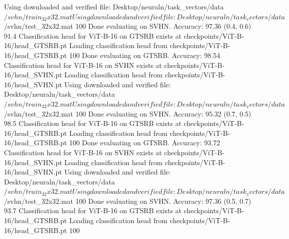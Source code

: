 Using downloaded and verified file: Desktop/neuraln/task_vectors/data$/svhn/train_32x32.mat
Using downloaded and verified file: Desktop/neuraln/task_vectors/data$/svhn/test_32x32.mat
100%
Done evaluating on SVHN. Accuracy: 97.36%
  (0.4, 0.6)        91.4%
Classification head for ViT-B-16 on GTSRB exists at checkpoints/ViT-B-16/head_GTSRB.pt
Loading classification head from checkpoints/ViT-B-16/head_GTSRB.pt
100%
Done evaluating on GTSRB. Accuracy: 98.54%
Classification head for ViT-B-16 on SVHN exists at checkpoints/ViT-B-16/head_SVHN.pt
Loading classification head from checkpoints/ViT-B-16/head_SVHN.pt
Using downloaded and verified file: Desktop/neuraln/task_vectors/data$/svhn/train_32x32.mat
Using downloaded and verified file: Desktop/neuraln/task_vectors/data$/svhn/test_32x32.mat
100%
Done evaluating on SVHN. Accuracy: 95.32%
  (0.7, 0.5)        98.5%
Classification head for ViT-B-16 on GTSRB exists at checkpoints/ViT-B-16/head_GTSRB.pt
Loading classification head from checkpoints/ViT-B-16/head_GTSRB.pt
100%
Done evaluating on GTSRB. Accuracy: 93.72%
Classification head for ViT-B-16 on SVHN exists at checkpoints/ViT-B-16/head_SVHN.pt
Loading classification head from checkpoints/ViT-B-16/head_SVHN.pt
Using downloaded and verified file: Desktop/neuraln/task_vectors/data$/svhn/train_32x32.mat
Using downloaded and verified file: Desktop/neuraln/task_vectors/data$/svhn/test_32x32.mat
100%
Done evaluating on SVHN. Accuracy: 97.36%
  (0.5, 0.7)        93.7%
Classification head for ViT-B-16 on GTSRB exists at checkpoints/ViT-B-16/head_GTSRB.pt
Loading classification head from checkpoints/ViT-B-16/head_GTSRB.pt
100%
